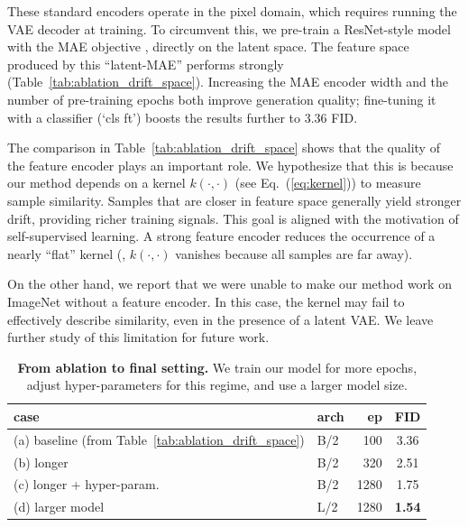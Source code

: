 These standard encoders operate in the pixel domain, which requires running the VAE decoder at training.
To circumvent this, we pre-train a ResNet-style model with the MAE objective \cite{he2022masked}, directly on the latent space.
The feature space produced by this ``latent-MAE'' performs strongly (Table~\ref{tab:ablation_drift_space}). Increasing the MAE encoder width and the number of pre-training epochs both improve generation quality; fine-tuning it with a classifier (`cls ft') boosts the results further to 3.36 FID.

The comparison in Table~\ref{tab:ablation_drift_space} shows that the quality of the feature encoder plays an important role.
We hypothesize that this is because our method depends on a kernel $k(\cdot, \cdot)$ (see Eq.~(\ref{eq:kernel})) to measure sample similarity. Samples that are closer in feature space generally yield stronger drift, providing richer training signals. This goal is aligned with the motivation of self-supervised learning.
A strong feature encoder reduces the occurrence of a nearly ``flat'' kernel (\ie, $k(\cdot, \cdot)$ vanishes because all samples are far away).


On the other hand, we report that we were unable to make our method work on ImageNet without a feature encoder. In this case, the kernel may fail to effectively describe similarity, even in the presence of a latent VAE. We leave further study of this limitation for future work.

\begin{table}[t]
    \centering
    \caption{\textbf{From ablation to final setting.} We train our model for more epochs, adjust hyper-parameters for this regime, and use a larger model size.
    }
\label{tab:ablation_final}
    \tablefontsize
    \begin{tabular}{l |l r| c}
    \toprule
    case & arch & ep & FID \\
    \midrule
    (a) baseline (from Table~\ref{tab:ablation_drift_space}) & B/2 & 100 & 3.36 \\
    \midrule
    (b) longer & B/2 & 320 & 2.51 \\
    (c) longer + hyper-param. & B/2 & 1280 & 1.75 \\
    (d) larger model & L/2  & 1280 & \textbf{1.54} \\
    \bottomrule
    \end{tabular}
\end{table}

